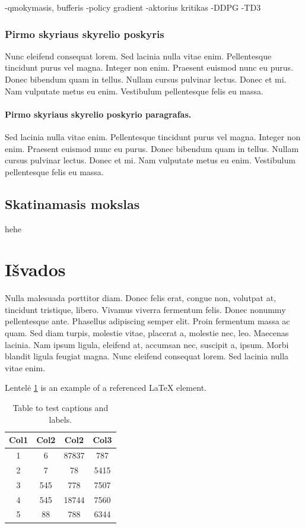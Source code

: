 \documentclass[a4paper, 12pt]{article}
\begin{document}
-qmokymasis, bufferis
-policy gradient
-aktorius kritikas
-DDPG
-TD3

%
\subsubsection{Pirmo skyriaus skyrelio poskyris}
%
Nunc eleifend consequat lorem. Sed lacinia nulla vitae enim. Pellentesque 
tincidunt purus vel magna. Integer non enim. Praesent euismod nunc eu purus. 
Donec bibendum quam in tellus. Nullam cursus pulvinar lectus. Donec et mi. 
Nam vulputate metus eu enim. Vestibulum pellentesque felis eu massa.
%
\paragraph{Pirmo skyriaus skyrelio poskyrio paragrafas.} 
%

Sed lacinia nulla vitae enim. Pellentesque tincidunt purus vel magna. Integer 
non enim. Praesent euismod nunc eu purus. Donec bibendum quam in tellus. 
Nullam cursus pulvinar lectus. Donec et mi. Nam vulputate metus eu enim. 
Vestibulum pellentesque felis eu massa.
%
%
\subsection{Skatinamasis mokslas}
hehe
%
%






\newpage
\section*{Išvados}
{}
%
Nulla malesuada porttitor diam. Donec felis erat, congue non, volutpat at, 
tincidunt tristique, libero. Vivamus viverra fermentum felis. Donec nonummy 
pellentesque ante. Phasellus adipiscing semper elit. Proin fermentum massa ac 
quam. Sed diam turpis, molestie vitae, placerat a, molestie nec, leo. 
Maecenas lacinia. Nam ipsum ligula, eleifend at, accumsan nec, suscipit a, 
ipsum. Morbi blandit ligula feugiat magna. Nunc eleifend consequat lorem. Sed 
lacinia nulla vitae enim. 



Lentelė \ref{lentele} is an example of a referenced \LaTeX{} element.

\begin{table}[h!]
\centering
\begin{tabular}{||c c c c||} 
 \hline
 Col1 & Col2 & Col2 & Col3 \\ [0.5ex] 
 \hline\hline
 1 & 6 & 87837 & 787 \\ 
 2 & 7 & 78 & 5415 \\
 3 & 545 & 778 & 7507 \\
 4 & 545 & 18744 & 7560 \\
 5 & 88 & 788 & 6344 \\ [1ex] 
 \hline
\end{tabular}
\caption{Table to test captions and labels.}
\label{lentele}
\end{table}
\end{document}

